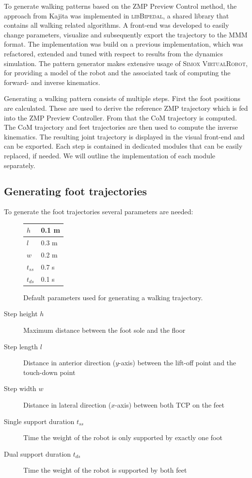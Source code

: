 \documentclass[english,ngerman]{KITreprt}
\newcommand{\name}[1]{\textsc{#1}}
\begin{document}
To generate walking patterns based on the ZMP Preview Control method,
the approach from Kajita was implemented in \name{libBipedal}, a shared
library that contains all walking related algorithms. A front-end was
developed to easily change parameters, visualize and subsequently export
the trajectory to the \name{MMM} format. The implementation was build on
a previous implementation, which was refactored, extended and tuned with
respect to results from the dynamics simulation. The pattern generator
makes extensive usage of \name{Simox VirtualRobot}, for providing a
model of the robot and the associated task of computing the forward- and
inverse kinematics.

Generating a walking pattern consists of multiple steps. First the foot
positions are calculated. These are used to derive the reference ZMP
trajectory which is fed into the ZMP Preview Controller. From that the
CoM trajectory is computed. The CoM trajectory and feet trajectories are
then used to compute the inverse kinematics. The resulting joint
trajectory is displayed in the visual front-end and can be exported.
Each step is contained in dedicated modules that can be easily replaced,
if needed. We will outline the implementation of each module separately.

\subsection{Generating foot
trajectories}\label{generating-foot-trajectories}

To generate the foot trajectories several parameters are needed:

\begin{figure}[b]
\begin{center}
  \begin{tabular}{| l | l |}
    \hline
    $h$ & 0.1 m \\ \hline
    $l$ & 0.3 m \\ \hline
    $w$ & 0.2 m \\ \hline
    $t_{ss}$ & 0.7 s\\ \hline
    $t_{ds}$ & 0.1 s\\ \hline
  \end{tabular}
\end{center}
\caption{Default parameters used for generating a walking trajectory.}
\label{table:pattern-parameters}
\end{figure}

\begin{description}
\item[Step height $h$]
Maximum distance between the foot sole and the floor
\item[Step length $l$]
Distance in anterior direction ($y$-axis) between the lift-off point and
the touch-down point
\item[Step width $w$]
Distance in lateral direction ($x$-axis) between both TCP on the feet
\item[Single support duration $t_{ss}$]
Time the weight of the robot is only supported by exactly one foot
\item[Dual support duration $t_{ds}$]
Time the weight of the robot is supported by both feet
\end{description}
\end{document}
